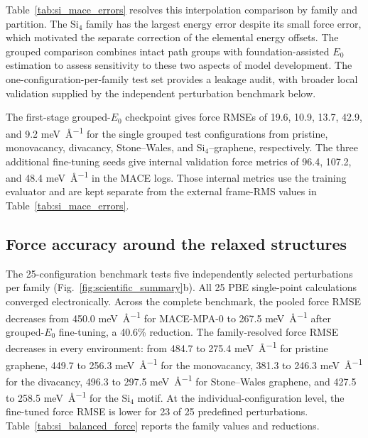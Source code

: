 Table~\ref{tab:si_mace_errors} resolves this interpolation comparison by family
and partition. The Si$_4$ family has the largest energy error despite its small
force error, which motivated the separate correction of the elemental energy
offsets. The grouped comparison combines intact path groups with
foundation-assisted $E_0$ estimation to assess sensitivity to these two aspects
of model development. The one-configuration-per-family test set provides a
leakage audit, with broader local validation supplied by the independent
perturbation benchmark below.



The first-stage grouped-$E_0$ checkpoint gives force RMSEs of 19.6, 10.9,
13.7, 42.9, and 9.2 \si{\milli\electronvolt\per\angstrom} for the single grouped test configurations
from pristine, monovacancy, divacancy, Stone--Wales, and Si$_4$--graphene,
respectively. The three additional
fine-tuning seeds give internal validation force metrics of 96.4, 107.2,
and 48.4 \si{\milli\electronvolt\per\angstrom} in the MACE logs. Those internal metrics use the
training evaluator and are kept separate from the external frame-RMS values
in Table~\ref{tab:si_mace_errors}.

\FloatBarrier
\subsection{Force accuracy around the relaxed structures}

The 25-configuration benchmark tests five independently selected perturbations
per family
(Fig.~\ref{fig:scientific_summary}b). All 25 PBE single-point calculations
converged electronically. Across the complete benchmark, the pooled
force RMSE decreases from 450.0 \si{\milli\electronvolt\per\angstrom} for MACE-MPA-0 to
267.5 \si{\milli\electronvolt\per\angstrom} after grouped-$E_0$ fine-tuning, a 40.6\% reduction. The
family-resolved force RMSE decreases in every environment: from 484.7 to 275.4
\si{\milli\electronvolt\per\angstrom} for pristine graphene, 449.7 to 256.3 \si{\milli\electronvolt\per\angstrom} for the
monovacancy, 381.3 to 246.3 \si{\milli\electronvolt\per\angstrom} for the divacancy, 496.3 to 297.5
\si{\milli\electronvolt\per\angstrom} for Stone--Wales graphene, and 427.5 to 258.5 \si{\milli\electronvolt\per\angstrom} for
the Si$_4$ motif. At the individual-configuration level, the fine-tuned force
RMSE is lower for 23 of 25 predefined perturbations.
Table~\ref{tab:si_balanced_force} reports the family values and reductions.

